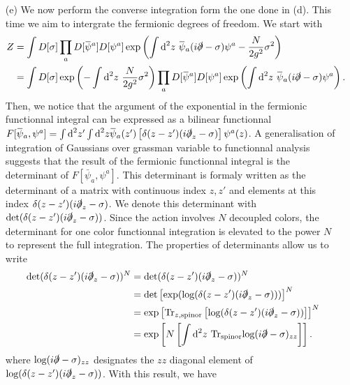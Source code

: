 \documentclass[10pt, a4paper]{article}
\begin{document}
\begin{enumerate}
  \item[(e)] We now perform the converse integration form the one done in (d). This time we aim to intergrate the fermionic degrees of freedom. We start with 
  \begin{align*}
    Z &= \int D[\sigma] \prod_{a} D[\bar{\psi}^a] D[\psi^a] \exp\left(\int \text{d}^2 z \ \bar{\psi}_a(i\slashed{\partial} - \sigma)\psi^a  - \frac{N}{2 g^2} \sigma^2\right)\\
    &= \int D[\sigma] \exp\left(- \int \text{d}^2 z\ \frac{N}{2g^2}\sigma^2\right) \prod_{a} D[\bar{\psi}^a] D[\psi^a] \exp\left(\int \text{d}^2 z \ \bar{\psi}_a(i\slashed{\partial} - \sigma)\psi^a\right).
  \end{align*}
  Then, we notice that the argument of the exponential in the fermionic functionnal integral can be expressed as a bilinear functionnal $F[\bar{\psi}_a, \psi^a] = \int \text{d}^2 z' \int \text{d}^2 z \bar{\psi}_a(z') \left[\delta(z-z') (i\slashed{\partial}_{z} - \sigma)\right] \psi^a (z)$. A generalisation of integration of Gaussians over grassman variable to functionnal analysis suggests that the result of the fermionic functionnal integral is the determinant of  $F[\bar{\psi}_a, \psi^a]$. This determinant is formaly written as the determinant of a matrix with continuous index $z, z'$ and elements at this index $\delta(z-z') (i\slashed{\partial}_{z} - \sigma)$. We denote this determinant with $\text{det}(\delta(z-z')(i\slashed{\partial}_{z} - \sigma))$. 
  \newpage
  Since the action involves $N$ decoupled colors, the determinant for one color functionnal integration is elevated to the power $N$ to represent the full integration. The properties of determinants allow us to write 
  \begin{align*}
    \text{det}(\delta(z-z')(i\slashed{\partial}_{z} - \sigma))^N &= \text{det}(\delta(z-z')(i\slashed{\partial}_{z} - \sigma))^N\\&=  \text{det}\left[ \exp(\text{log}(\delta(z-z')(i\slashed{\partial}_{z} - \sigma)))\right]^N\\&= \exp \left[\text{Tr}_{z, \text{spinor}}\left[\text{log}(\delta(z-z')(i\slashed{\partial}_{z} - \sigma))\right]\right]^N\\&= \exp \left[N \left[\int \text{d}^2 z \ \text{Tr}_{\text{spinor}}\text{log}(i  \slashed{\partial} - \sigma)_{zz}\right]\right].
  \end{align*}
  where $\text{log}(i  \slashed{\partial} - \sigma)_{zz}$ designates the $zz$ diagonal element of $\text{log}(\delta(z-z')(i\slashed{\partial}_{z} - \sigma))$. With this result, we have

\end{enumerate}
\end{document}
